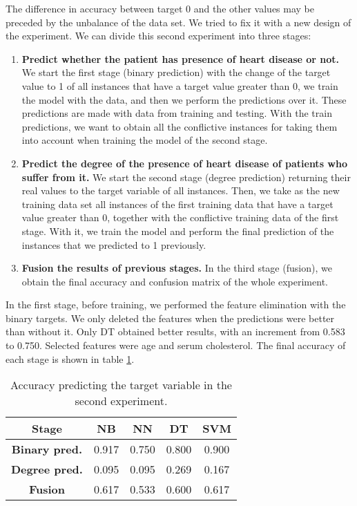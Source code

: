 The difference in accuracy between target 0 and the other values may be preceded by the unbalance of the data set. We tried to fix it with a new design of the experiment. We can divide this second experiment into three stages: 
\begin{enumerate}
    \item \textbf{Predict whether the patient has presence of heart disease or not.} We start the first stage (binary prediction) with the change of the target value to 1 of all instances that have a target value greater than 0, we train the model with the data, and then we perform the predictions over it. These predictions are made with data from training and testing. With the train predictions, we want to obtain all the conflictive instances for taking them into account when training the model of the second stage.
    \item \textbf{Predict the degree of the presence of heart disease of patients who suffer from it.} We start the second stage (degree prediction) returning their real values to the target variable of all instances. Then, we take as the new training data set all instances of the first training data that have a target value greater than 0, together with the conflictive training data of the first stage. With it, we train the model and perform the final prediction of the instances that we predicted to 1 previously.
    \item \textbf{Fusion the results of previous stages.} In the third stage (fusion), we obtain the final accuracy and confusion matrix of the whole experiment.
\end{enumerate}

In the first stage, before training, we performed the feature elimination with the binary targets. We only deleted the features when the predictions were better than without it. Only DT obtained better results, with an increment from 0.583 to 0.750. Selected features were age and serum cholesterol. The final accuracy of each stage is shown in table \ref{tab:second_exp}.

\begin{table}[hbtp]
    \centering
    \begin{tabular}{c c c c c}
        \toprule
        \textbf{Stage} & \textbf{NB} & \textbf{NN} & \textbf{DT} & \textbf{SVM} \\ \midrule
        \textbf{Binary pred.} & 0.917 & 0.750 & 0.800 & 0.900 \\
        \textbf{Degree pred.} & 0.095 & 0.095 & 0.269 & 0.167 \\
        \textbf{Fusion} & 0.617 & 0.533 & 0.600 & 0.617 \\
        \bottomrule
    \end{tabular}
    \caption{Accuracy predicting the target variable in the second experiment.}
    \label{tab:second_exp}
\end{table}

